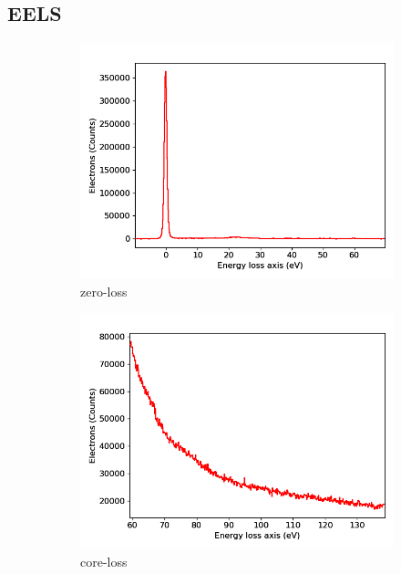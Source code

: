   \subsection{EELS}

	\begin{figure}[H]
		\centering
	\begin{subfigure}[b]{0.45\textwidth}
				\includegraphics[width= 1 \linewidth]{img/tem_zeroloss}
				\caption{zero-loss}
	\end{subfigure}
	\begin{subfigure}[b]{0.45\textwidth}
				\includegraphics[width= 1 \linewidth]{img/tem_coreloss}
				\caption{core-loss}
	\end{subfigure}
	\begin{subfigure}[b]{0.7\textwidth}

\end{subfigure}
\end{figure}
